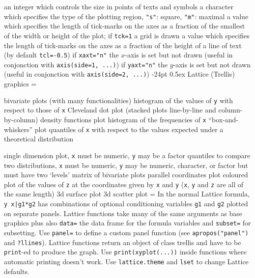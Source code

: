 \documentclass[10pt,landscape]{article}
\makeatletter
\renewcommand\section{\@startsection{section}{1}{0mm}%
                                     {-24pt}%
                                     {0.5ex}%
                                {\color{blue}\normalfont\large\bfseries}}
\newcommand{\code}{\texttt}
\makeatother
\begin{document}
\begin{multicols*}{3}
	{ an integer which controls the size in points of texts and symbols}
	{ a character which specifies the type of the plotting region, \code{"s"}: square, \code{"m"}: maximal}
  a value which specifies the length of tick-marks on the axes as a fraction of the smallest of the width or height of the plot; if \code{tck=1}	{a grid is drawn}
	{ a value which specifies the length of tick-marks on the axes as a fraction of the height of a line of text (by default \code{tcl=-0.5})}
  if \code{xaxt="n"}	{the $x$-axis is set but not drawn (useful in conjonction with \code{axis(side=1, ...)})}
  if \code{yaxt="n"}	{the $y$-axis is set but not drawn (useful in conjonction with \code{axis(side=2, ...)})}
\section{Lattice (Trellis) graphics}
\everypar={\hangindent=9mm}

	{ bivariate plots (with many functionalities)}
  histogram of the values of \code{y}	{with respect to those of \code{x}}
	{ Cleveland dot plot (stacked plots line-by-line and column-by-column)}
	{ density functions plot}
	{ histogram of the frequencies of \code{x}}
	{ ``box-and-whiskers'' plot}
  quantiles of \code{x}	{with respect to the values expected under a theoretical distribution}

  single dimension plot, \code{x} must be numeric, \code{y}	{may be a factor}
  quantiles to compare two distributions, \code{x} must be numeric, \code{y}	{may be numeric, character, or factor but must have two `levels'}
	{ matrix of bivariate plots}
	{ parallel coordinates plot}
  coloured plot of the values of \code{z} at the coordinates given by \code{x} and \code{y} (\code{x}, \code{y} and \code{z}	{are all of the same length)}
	{ 3d surface plot}
	{ 3d scatter plot}
\everypar={\hangindent=0mm}
In the normal Lattice formula, \code{y~x|g1*g2} has
combinations of optional conditioning variables \code{g1}
and \code{g2} plotted on separate panels. Lattice functions
take many of the same arguments as base
graphics plus also \code{data=} the data frame for the formula
variables and \code{subset=} for subsetting. Use \code{panel=} to
define a custom panel function (see \code{apropos("panel")}
and \code{?llines}). Lattice functions return an object of class
trellis and have to be \code{print}-ed to produce the graph. Use
\code{print(xyplot(...))} inside functions where automatic
printing doesn't work. Use \code{lattice.theme} and \code{lset} to
change Lattice defaults.

\end{multicols*}
\end{document}
